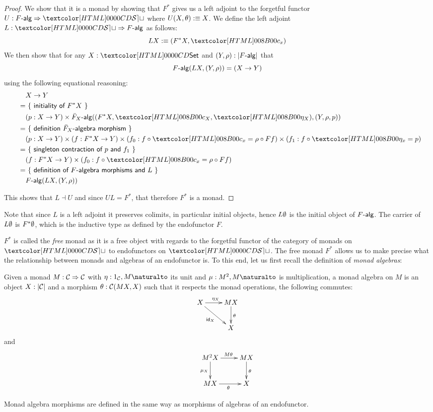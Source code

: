 \begin{proof}
  We show that it is a monad by showing that $F^*$ gives us a left
  adjoint to the forgetful functor $U : \Func{\algcat{F}}{\SET}$ where
  $U (X , \theta) :\equiv X$. We define the left adjoint
  $L : \Func{\SET}{\algcat{F}}$ as follows:
  $$
  L X \ddefeq (F^* X , \Fstarc_x)
  $$
  We then show that for any $X : \Set$ and $(Y,\rho) : | \algcat{F} |$ that
  $$
  \algcat{F}(L X , (Y,\rho)) = (X \to Y)
  $$
  using the following equational reasoning:
  \begin{align*}
    &&&X \to Y \\
    &&=&\ \reasontext{initiality of $F^* X$} \\
    &&&(p : X \to Y) \times \algcat{\bar{F}_X}((F^* X , \Fstarc_X , \Fstareta_X),(Y,\rho,p)) \\
    &&=&\ \reasontext{definition $\bar{F}_X$-algebra morphism} \\
    &&&(p : X \to Y) \times (f : F^* X \to Y) \times (f_0 : f \circ \Fstarc_x = \rho \circ Ff) \times (f_1 : f \circ \Fstareta_x = p) \\
    &&=&\ \reasontext{singleton contraction of $p$ and $f_1$} \\
    &&&(f : F^* X \to Y) \times (f_0 : f \circ \Fstarc_x = \rho \circ Ff) \\
    &&=&\ \reasontext{definition of $F$-algebra morphisms and $L$} \\
    &&&\algcat{F}(L X , (Y,\rho))
  \end{align*}

  This shows that $L \dashv U$ and since $UL = F^*$, that therefore
  $F^*$ is a monad.
\end{proof}

Note that since $L$ is a left adjoint it preserves colimits, in
particular initial objects, hence $L \emptyset$ is the initial object
of $\algcat{F}$. The carrier of $L \emptyset$ is $F^* \emptyset$, which
is the inductive type as defined by the endofunctor $F$.

$F^*$ is called the \emph{free} monad as it is a free object with
regards to the forgetful functor of the category of monads on $\SET$
to endofunctors on $\SET$. The free monad $F^*$ allows us to make
precise what the relationship between monads and algebras of an
endofunctor is. To this end, let us first recall the definition of
\emph{monad algebras}:

\begin{definition}
  Given a monad $M : \mathcal{C} \Rightarrow \mathcal{C}$ with $\eta : \Nat{1_{\Cc},M}$
  its unit and $\mu : \Nat{M^2,M}$ is multiplication, a monad algebra
  on $M$ is an object $X : | \mathcal{C} |$ and a morphism
  $\theta : \mathcal{C}(MX,X)$ such that it respects the monad operations, \ie
  the following commutes:
  $$
  \xymatrix{
    X \ar[r]^{\eta_X} \ar[dr]_{\id_X} &MX \ar[d]^{\theta} \\
    &X
  }
  $$
  and
  $$
  \xymatrix{
    &M^2 X \ar[r]^{M \theta} \ar[d]_{\mu_X} &MX \ar[d]^{\theta} \\
    &MX \ar[r]_{\theta} &X
  }
  $$

  Monad algebra morphisms are defined in the same way as morphisms of
  algebras of an endofunctor.
\end{definition}

